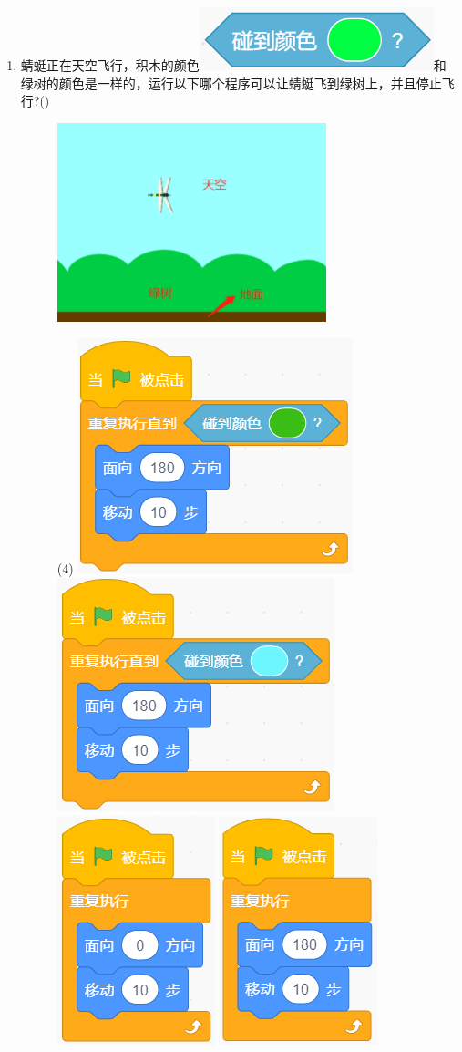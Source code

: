 \documentclass[10pt, a4paper]{article}
\begin{document}
\begin{enumerate}
        \item 蜻蜓正在天空飞行，积木的颜色\includegraphics[width=.1\textwidth]{22-1.png}和绿树的颜色是一样的，运行以下哪个程序可以让蜻蜓飞到绿树上，并且停止飞行?(\qquad)
        \begin{figure}[htbp]
            \begin{minipage}{.2\textwidth}
                \centering
                \includegraphics[width=\textwidth]{22-2.png}
            \end{minipage}
            \begin{minipage}{.78\textwidth}
                \begin{tasks}(4)
                    \task \includegraphics[width=.18\textwidth]{22a.png}
                    \task \includegraphics[width=.18\textwidth]{22b.png}
                    \task \includegraphics[width=.12\textwidth]{22c.png}
                    \task \includegraphics[width=.12\textwidth]{22d.png}
                \end{tasks}
            \end{minipage}
        \end{figure}


\end{enumerate}
\end{document}
